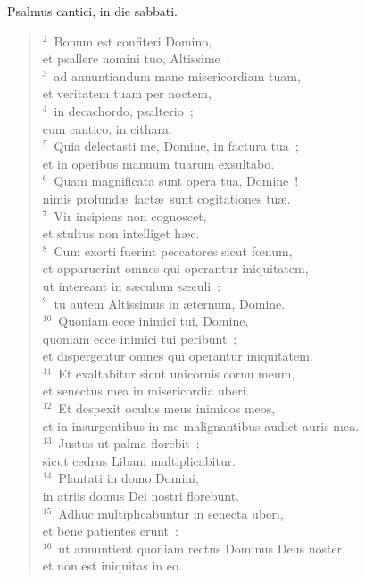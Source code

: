 \bchapter
\lettrine[lines=3,image=true,loversize=0.05,lraise=-0.03]{P}{}salmus cantici, in die sabbati.
\begin{flushleft}\begin{verse}\vspace{6pt}${}^{2}$~Bonum est confiteri Domino,\\ et psallere nomini tuo, Altissime~:\\
${}^{3}$~ad annuntiandum mane misericordiam tuam,\\ et veritatem tuam per noctem,\\
${}^{4}$~in decachordo, psalterio~;\\ cum cantico, in cithara.\\
${}^{5}$~Quia delectasti me, Domine, in factura tua~;\\ et in operibus manuum tuarum exsultabo.\\
${}^{6}$~Quam magnificata sunt opera tua, Domine~!\\ nimis profund\ae\ fact\ae\ sunt cogitationes tu\ae .\\
${}^{7}$~Vir insipiens non cognoscet,\\ et stultus non intelliget h\ae c.\\
${}^{8}$~Cum exorti fuerint peccatores sicut fœnum,\\ et apparuerint omnes qui operantur iniquitatem,\\ ut intereant in s\ae culum s\ae culi~:\\
${}^{9}$~tu autem Altissimus in \ae ternum, Domine.\\
${}^{10}$~Quoniam ecce inimici tui, Domine,\\ quoniam ecce inimici tui peribunt~;\\ et dispergentur omnes qui operantur iniquitatem.\\
${}^{11}$~Et exaltabitur sicut unicornis cornu meum,\\ et senectus mea in misericordia uberi.\\
${}^{12}$~Et despexit oculus meus inimicos meos,\\ et in insurgentibus in me malignantibus audiet auris mea.\\
${}^{13}$~Justus ut palma florebit~;\\ sicut cedrus Libani multiplicabitur.\\
${}^{14}$~Plantati in domo Domini,\\ in atriis domus Dei nostri florebunt.\\
${}^{15}$~Adhuc multiplicabuntur in senecta uberi,\\ et bene patientes erunt~:\\
${}^{16}$~ut annuntient quoniam rectus Dominus Deus noster,\\ et non est iniquitas in eo.\end{verse}\end{flushleft}



